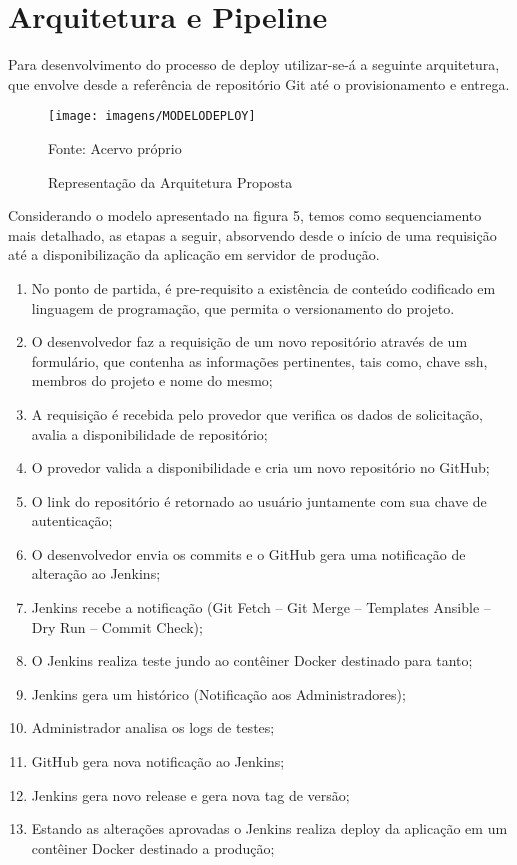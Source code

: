\section{Arquitetura e Pipeline}

Para desenvolvimento do processo de deploy utilizar-se-á a seguinte arquitetura, que envolve desde a referência de repositório Git até o provisionamento e entrega.

\begin{figure} [htb]
	\centering
	\texttt{[image: imagens/MODELODEPLOY]}
	\caption{Representação da Arquitetura Proposta}
	Fonte: Acervo próprio
	\label{fig:modelodeploy}
\end{figure}


Considerando o modelo apresentado na figura 5, temos como sequenciamento mais detalhado, as etapas a seguir, absorvendo desde o início de uma requisição até a disponibilização da aplicação em servidor de produção.
\begin{enumerate}
	\item No ponto de partida, é pre-requisito a existência de conteúdo codificado em linguagem de programação, que permita o versionamento do projeto.
	\item O desenvolvedor faz a requisição de um novo repositório através de um formulário, que contenha as informações pertinentes, tais como, chave ssh, membros do projeto e nome do mesmo;
	\item A requisição é recebida pelo provedor que verifica os dados de solicitação, avalia a disponibilidade de repositório;
	\item O provedor valida a disponibilidade e cria um novo repositório no GitHub;
	\item O link do repositório é retornado ao usuário juntamente com sua chave de autenticação;
	\item O desenvolvedor envia os commits e o GitHub gera uma notificação de alteração ao Jenkins;
	\item Jenkins recebe a notificação (Git Fetch – Git Merge – Templates Ansible – Dry Run – Commit Check);
	\item O Jenkins realiza teste jundo ao contêiner Docker destinado para tanto;
	\item Jenkins gera um histórico (Notificação aos Administradores);
	\item Administrador analisa os logs de testes;
	\item GitHub gera nova notificação ao Jenkins;
	\item Jenkins gera novo release e gera nova tag de versão;
	\item Estando as alterações aprovadas o Jenkins realiza deploy da aplicação em um contêiner Docker destinado a produção;
\end{enumerate}

